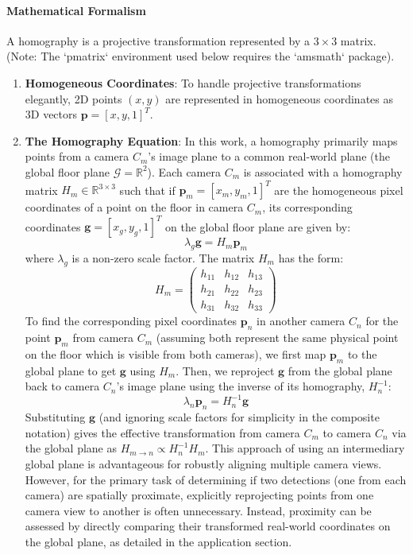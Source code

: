 \documentclass[12pt, a4paper]{article}
\begin{document}
\paragraph{Mathematical Formalism}
A homography is a projective transformation represented by a $3 \times 3$ matrix. (Note: The `pmatrix` environment used below requires the `amsmath` package).
\begin{enumerate}
    \item \textbf{Homogeneous Coordinates}: To handle projective transformations elegantly, 2D points $(x, y)$ are represented in homogeneous coordinates as 3D vectors $\mathbf{p} = [x, y, 1]^T$.

    \item \textbf{The Homography Equation}: In this work, a homography primarily maps points from a camera $C_m$'s image plane to a common real-world plane (the global floor plane $\mathcal{G} = \mathbb{R}^2$). Each camera $C_m$ is associated with a homography matrix $H_m \in \mathbb{R}^{3 \times 3}$ such that if $\mathbf{p}_m = [x_m, y_m, 1]^T$ are the homogeneous pixel coordinates of a point on the floor in camera $C_m$, its corresponding coordinates $\mathbf{g} = [x_g, y_g, 1]^T$ on the global floor plane are given by:
    $$\lambda_g \mathbf{g} = H_m \mathbf{p}_m$$
    where $\lambda_g$ is a non-zero scale factor. The matrix $H_m$ has the form:
    $$H_m = \begin{pmatrix} h_{11} & h_{12} & h_{13} \\ h_{21} & h_{22} & h_{23} \\ h_{31} & h_{32} & h_{33} \end{pmatrix}$$
    To find the corresponding pixel coordinates $\mathbf{p}_n$ in another camera $C_n$ for the point $\mathbf{p}_m$ from camera $C_m$ (assuming both represent the same physical point on the floor which is visible from both cameras), we first map $\mathbf{p}_m$ to the global plane to get $\mathbf{g}$ using $H_m$. Then, we reproject $\mathbf{g}$ from the global plane back to camera $C_n$'s image plane using the inverse of its homography, $H_n^{-1}$:
    $$\lambda_n \mathbf{p}_n = H_n^{-1} \mathbf{g}$$
    Substituting $\mathbf{g}$ (and ignoring scale factors for simplicity in the composite notation) gives the effective transformation from camera $C_m$ to camera $C_n$ via the global plane as $H_{m \to n} \propto H_n^{-1} H_m$. This approach of using an intermediary global plane is advantageous for robustly aligning multiple camera views. However, for the primary task of determining if two detections (one from each camera) are spatially proximate, explicitly reprojecting points from one camera view to another is often unnecessary. Instead, proximity can be assessed by directly comparing their transformed real-world coordinates on the global plane, as detailed in the application section.


\end{enumerate}
\end{document}

